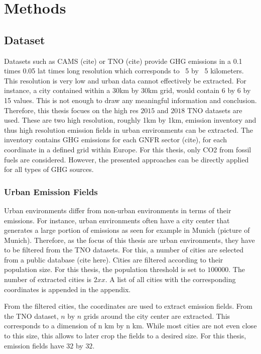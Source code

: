 
\chapter{Methods}\label{chapter:methods}

\section{Dataset}
Datasets such as CAMS (cite) or TNO (cite) provide GHG emissions in a 0.1 times 0.05 lat times long resolution which corresponds to ~5 by ~5 kilometers.
This resolution is very low and urban data cannot effectively be extracted.
For instance, a city contained within a 30km by 30km grid, would contain 6 by 6 by 15 values.
This is not enough to draw any meaningful information and conclusion. 
Therefore, this thesis focues on the high res $2015$ and $2018$ TNO datasets are used.
These are two high resolution, roughly 1km by 1km, emission inventory and thus high resolution emission fields in urban environments can be extracted.
The inventory contains GHG emissions for each GNFR sector (cite), for each coordinate in a defined grid within Europe.
For this thesis, only CO2 from fossil fuels are considered.
However, the presented approaches can be directly applied for all types of GHG sources.

\subsection{Urban Emission Fields}
Urban environments differ from non-urban environments in terms of their emissions.
For instance, urban environments often have a city center that generates a large portion of emissions as seen for example in Munich (picture of Munich).
Therefore, as the focus of this thesis are urban environments, they have to be filtered from the TNO datasets.
For this, a number of cities are selected from a public database (cite here).
Cities are filtered according to their population size.
For this thesis, the population threshold is set to $100000$.
The number of extracted cities is $2xx$.
A list of all cities with the corresponding coordinates is appended in the appendix.

From the filtered cities, the coordinates are used to extract emission fields.
From the TNO dataset, $n$ by $n$ grids around the city center are extracted.
This corresponds to a dimension of n km by n km.
While most cities are not even close to this size, this allows to later crop the fields to a desired size.
For this thesis, emission fields have $32$ by $32$.

